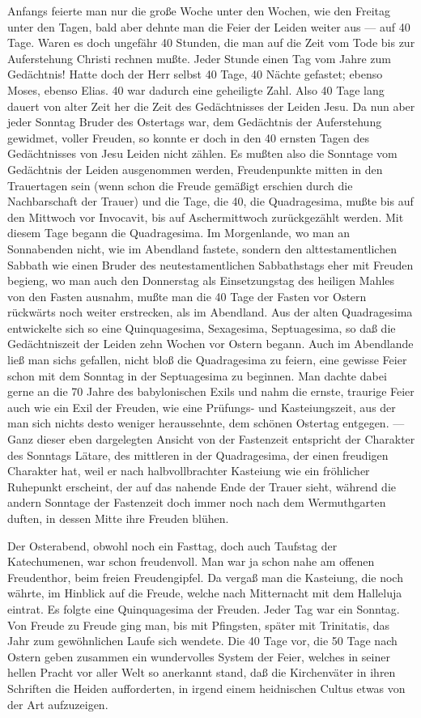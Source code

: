 Anfangs feierte man nur die große Woche unter den Wochen, wie den Freitag unter den Tagen, bald aber dehnte man die Feier der Leiden weiter aus — auf 40 Tage. Waren es doch ungefähr 40 Stunden, die man auf die Zeit vom Tode bis zur Auferstehung Christi rechnen mußte. Jeder Stunde einen Tag vom Jahre zum Gedächtnis! Hatte doch der Herr selbst 40 Tage, 40 Nächte gefastet; ebenso Moses, ebenso Elias. 40 war dadurch eine geheiligte Zahl. Also 40 Tage lang dauert von alter Zeit her die Zeit des Gedächtnisses der Leiden Jesu. Da nun aber jeder Sonntag Bruder des Ostertags war, dem Gedächtnis der Auferstehung gewidmet, voller Freuden, so konnte er doch in den 40 ernsten Tagen des Gedächtnisses von Jesu Leiden nicht zählen. Es mußten also die Sonntage vom Gedächtnis der Leiden ausgenommen werden, Freudenpunkte mitten in den Trauertagen sein (wenn schon die Freude gemäßigt erschien durch die Nachbarschaft der Trauer) und die Tage, die 40, die Quadragesima, mußte bis auf den Mittwoch vor Invocavit, bis auf Aschermittwoch zurückgezählt werden. Mit diesem Tage begann die Quadragesima. Im Morgenlande, wo man an Sonnabenden nicht, wie im Abendland fastete, sondern den alttestamentlichen
Sabbath wie einen Bruder des neutestamentlichen Sabbathstags eher mit Freuden begieng, wo man auch den Donnerstag als Einsetzungstag des heiligen Mahles von den Fasten ausnahm, mußte man die 40 Tage der Fasten vor Ostern rückwärts noch weiter erstrecken, als im Abendland. Aus der alten Quadragesima entwickelte sich so eine Quinquagesima, Sexagesima, Septuagesima, so daß die Gedächtniszeit der Leiden zehn Wochen vor Ostern begann. Auch im Abendlande ließ man sichs gefallen, nicht bloß die Quadragesima zu feiern, eine gewisse Feier schon mit dem Sonntag in der Septuagesima zu beginnen. Man dachte dabei gerne an die 70 Jahre des babylonischen Exils und nahm die ernste, traurige Feier auch wie ein Exil der Freuden, wie eine Prüfungs- und Kasteiungszeit, aus der man sich nichts desto weniger heraussehnte, dem schönen Ostertag entgegen. — Ganz dieser eben dargelegten Ansicht von der Fastenzeit entspricht der Charakter des Sonntags Lätare, des mittleren in der Quadragesima, der einen freudigen Charakter hat, weil er nach halbvollbrachter Kasteiung wie ein fröhlicher Ruhepunkt erscheint, der auf das nahende Ende der Trauer sieht, während die andern Sonntage der Fastenzeit doch immer noch nach dem Wermuthgarten duften, in dessen Mitte ihre Freuden blühen.

Der Osterabend, obwohl noch ein Fasttag, doch auch Taufstag der Katechumenen, war schon freudenvoll. Man war ja schon nahe am offenen Freudenthor, beim freien Freudengipfel. Da vergaß man die Kasteiung, die noch währte, im Hinblick auf die Freude, welche nach Mitternacht mit dem
Halleluja eintrat. Es folgte eine Quinquagesima der Freuden. Jeder Tag war ein Sonntag. Von Freude zu Freude ging man, bis mit Pfingsten, später mit Trinitatis, das Jahr zum gewöhnlichen Laufe sich wendete. Die 40 Tage vor, die 50 Tage nach Ostern geben zusammen ein wundervolles System der Feier, welches in seiner hellen Pracht vor aller Welt so anerkannt stand, daß die Kirchenväter in ihren Schriften die Heiden aufforderten, in irgend einem heidnischen Cultus etwas von der Art aufzuzeigen.

